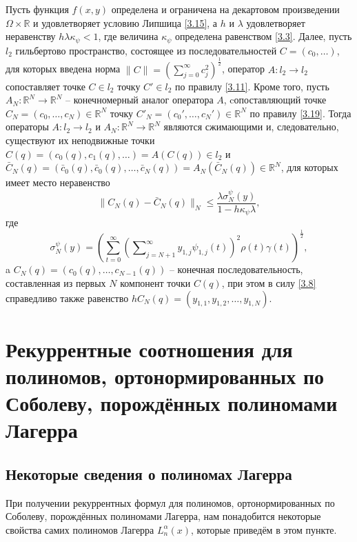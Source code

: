 \begin{theorem}\label{RItheo3}
Пусть функция   $f(x,y)$  определена и ограничена на декартовом произведении $\Omega\times\mathbb{R}$ и удовлетворяет условию Липшица \eqref{3.15}, а $h$ и $\lambda$ удовлетворяет неравенству $h\lambda\kappa_\psi<1$, где величина $\kappa_\psi$ определена равенством \eqref{3.3}. Далее, пусть $l_2$ гильбертово пространство, состоящее из последовательностей $C=(c_0,\ldots)$, для которых введена норма $\|C\|=\left(\sum_{j=0}^\infty c_j^2\right)^\frac12$,   оператор $A: l_2\to l_2$ сопоставляет точке $C\in l_2$ точку $C'\in l_2$ по правилу \eqref{3.11}. Кроме того, пусть $A_N:\mathbb{R}^N\to \mathbb{R}^N$ -- конечномерный аналог оператора $A$, cопоставляющий точке $C_N=(c_0,\ldots,c_{N})\in \mathbb{R}^N $ точку  $C'_N=(c_0',\ldots,c_{N}')\in \mathbb{R}^N $ по правилу \eqref{3.19}.
Тогда операторы $A: l_2\to l_2$ и $A_N:\mathbb{R}^N\to \mathbb{R}^N$ являются сжимающими и, следовательно, существуют  их неподвижные точки $C(q)=(c_0(q),c_1(q),\ldots)=A(C(q))\in l_2$ и $\bar C_N(q)=(\bar c_0(q),\bar c_0(q),\ldots,\bar c_{N}(q))=A_N(\bar C_N(q))\in \mathbb{R}^N$, для которых имеет место неравенство
\begin{equation}\label{3.28}
\|C_N(q)-\bar C_N(q)\|_N\le \frac{\lambda \sigma_N^\psi(y)}{1-h\kappa_\psi\lambda},
\end{equation}
где
\begin{equation}\label{3.30}
\sigma_N^\psi(y)=\left(\sum_{t=0}^\infty\left(\sum\nolimits_{j=N+1}^\infty  y_{1,j}\psi_{1,j}(t)\right)^2\rho(t)\gamma(t) \right)^\frac12,
\end{equation}
 a $C_N(q)=(c_0(q),\ldots,c_{N-1}(q))$ -- конечная последовательность, составленная из первых $N$ компонент точки  $C(q)$, при этом в силу  \eqref{3.8} справедливо также равенство  $hC_N(q)=(y_{1,1}, y_{1,2}, \ldots, y_{1,N})$.
\end{theorem}











\chapter{Рекуррентные соотношения для полиномов, ортонормированных по Соболеву, порождённых полиномами Лагерра}

\section{Некоторые сведения о полиномах Лагерра}
При получении рекуррентных формул для полиномов, ортонормированных по Соболеву, порождённых полиномами Лагерра, нам понадобится некоторые свойства самих полиномов Лагерра $L_n^\alpha(x)$, которые приведём в этом пункте.

